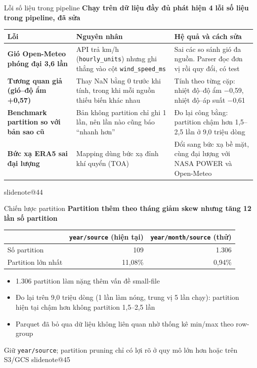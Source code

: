 \documentclass[t,aspectratio=169,12pt]{beamer}
\makeatletter
\newcommand{\slidenote}[1]{\ifcsname slidenote@#1\endcsname\note{\csname slidenote@#1\endcsname}\fi}
\newcommand{\ketluan}[1]{\vskip2mm{\color{hustred}#1}}
\newcommand{\ychinh}[1]{\vskip1mm{\bfseries #1}\par\vskip1mm}
\makeatother
\begin{document}
\begin{frame}{Lỗi số liệu trong pipeline}
  \ychinh{Chạy trên dữ liệu đầy đủ phát hiện 4 lỗi số liệu trong pipeline, đã sửa}
  \scriptsize
  \renewcommand{\arraystretch}{0.95}
  \begin{tabular}{@{}>{\bfseries}p{3.3cm}p{5.0cm}p{5.3cm}@{}}
    \toprule
    Lỗi & Nguyên nhân & Hệ quả và cách sửa \\
    \midrule
    Gió Open-Meteo phóng đại 3,6 lần & API trả km/h (\texttt{hourly\_units}) nhưng ghi thẳng vào cột \texttt{wind\_speed\_ms} & Sai các so sánh gió đa nguồn. Parser đọc đơn vị rồi quy đổi, có test \\ \addlinespace[2pt]
    Tương quan giả (gió--độ ẩm +0,57) & Thay NaN bằng 0 trước khi tính, trong khi mỗi nguồn thiếu biến khác nhau & Tính theo từng cặp: nhiệt độ--độ ẩm $-$0,59, nhiệt độ--áp suất $-$0,61 \\ \addlinespace[2pt]
    Benchmark partition so với bản sao cũ & Bản không partition chỉ ghi 1 lần, nên lần nào cũng báo ``nhanh hơn'' & Đo lại công bằng: partition chậm hơn 1,5--2,5 lần ở 9,0 triệu dòng \\ \addlinespace[2pt]
    Bức xạ ERA5 sai đại lượng & Mapping dùng bức xạ đỉnh khí quyển (TOA) & Đổi sang bức xạ bề mặt, cùng đại lượng với NASA POWER và Open-Meteo \\
    \bottomrule
  \end{tabular}
  \slidenote{44}
\end{frame}
\begin{frame}{Chiến lược partition}
  \ychinh{Partition thêm theo tháng giảm skew nhưng tăng 12 lần số partition}
  \centering\small
  \begin{tabular}{@{}lrr@{}}
    \toprule
    & \texttt{year/source} (hiện tại) & \texttt{year/month/source} (thử) \\
    \midrule
    Số partition & 109 & 1.306 \\
    Partition lớn nhất & 11,08\% & \textcolor{goodgreen}{0,94\%} \\
    \bottomrule
  \end{tabular}
  \raggedright
  \begin{itemize}\small\setlength\itemsep{1mm}
    \item 1.306 partition làm nặng thêm vấn đề small-file
    \item Đo lại trên 9,0 triệu dòng (1 lần làm nóng, trung vị 5 lần chạy): partition hiện tại chậm hơn không partition 1,5--2,5 lần
    \item Parquet đã bỏ qua dữ liệu không liên quan nhờ thống kê min/max theo row-group
  \end{itemize}
  \ketluan{Giữ \texttt{year/source}; partition pruning chỉ có lợi rõ ở quy mô lớn hơn hoặc trên S3/GCS}
  \slidenote{45}
\end{frame}
\end{document}
